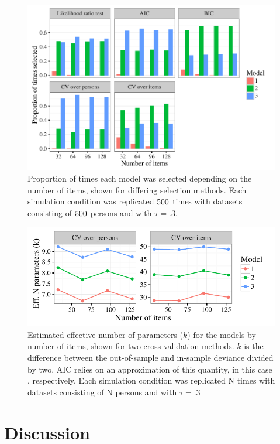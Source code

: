 \documentclass[12pt, letterpaper]{article}
\begin{document}
\begin{figure}[tbp]
	\centering
	\includegraphics{chapter_2/figs/select_overnitems.pdf}
	\caption{Proportion of times each model was selected depending on the number of items, shown for differing selection methods. Each simulation condition was replicated $500$ times with datasets consisting of $500$ persons and with $\tau = .3$.}
	\label{fig:select-overnitems}
\end{figure}

\begin{figure}[tbp]
	\centering
	\includegraphics{chapter_2/figs/k_overnitems.pdf}
	\caption{Estimated effective number of parameters ($k$) for the models by number of items, shown for two cross-validation methods. $k$ is the difference between the out-of-sample and in-sample deviance divided by two. AIC relies on an approximation of this quantity, in this case \aic[and], respectively. Each simulation condition was replicated N times with datasets consisting of N persons and with $\tau = .3$}
	\label{fig:k-overnitems}
\end{figure}

\section{Discussion}


%
%
\end{document}
